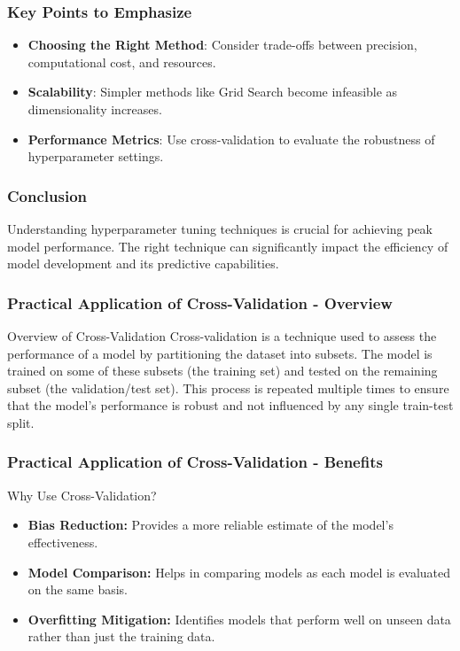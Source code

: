 \documentclass{beamer}
\begin{document}
\begin{frame}
    \frametitle{Key Points to Emphasize}
    \begin{itemize}
        \item \textbf{Choosing the Right Method}: Consider trade-offs between precision, computational cost, and resources.
        \item \textbf{Scalability}: Simpler methods like Grid Search become infeasible as dimensionality increases.
        \item \textbf{Performance Metrics}: Use cross-validation to evaluate the robustness of hyperparameter settings.
    \end{itemize}
\end{frame}

\begin{frame}
    \frametitle{Conclusion}
    Understanding hyperparameter tuning techniques is crucial for achieving peak model performance. The right technique can significantly impact the efficiency of model development and its predictive capabilities.
\end{frame}

\begin{frame}[fragile]
    \frametitle{Practical Application of Cross-Validation - Overview}
    \begin{block}{Overview of Cross-Validation}
        Cross-validation is a technique used to assess the performance of a model by partitioning the dataset into subsets. The model is trained on some of these subsets (the training set) and tested on the remaining subset (the validation/test set). This process is repeated multiple times to ensure that the model's performance is robust and not influenced by any single train-test split.
    \end{block}
\end{frame}

\begin{frame}[fragile]
    \frametitle{Practical Application of Cross-Validation - Benefits}
    \begin{block}{Why Use Cross-Validation?}
        \begin{itemize}
            \item \textbf{Bias Reduction:} Provides a more reliable estimate of the model's effectiveness.
            \item \textbf{Model Comparison:} Helps in comparing models as each model is evaluated on the same basis.
            \item \textbf{Overfitting Mitigation:} Identifies models that perform well on unseen data rather than just the training data.
        \end{itemize}
    \end{block}
\end{frame}
\end{document}

